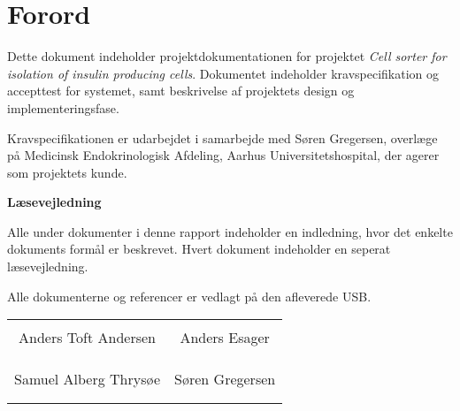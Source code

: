 \chapter*{Forord}

Dette dokument indeholder projektdokumentationen for projektet \textit{Cell sorter for isolation of insulin producing cells}. Dokumentet indeholder kravspecifikation og accepttest for systemet, samt beskrivelse af projektets design og implementeringsfase. 

Kravspecifikationen er udarbejdet i samarbejde med Søren Gregersen, overlæge på Medicinsk Endokrinologisk Afdeling, Aarhus Universitetshospital, der agerer som projektets kunde. 

\textbf{Læsevejledning}

Alle under dokumenter i denne rapport indeholder en indledning, hvor det enkelte dokuments formål er beskrevet. Hvert dokument indeholder en seperat læsevejledning.


Alle dokumenterne og referencer er vedlagt på den afleverede USB.

\phantom{Luft}

\phantom{Luft}

\begin{table}[H]
	\centering
		\begin{tabular}{c c}
			\underline{\phantom{mmmmmmmmmmmmmm}} & \underline{\phantom{mmmmmmmmmmmmmm}}  \\
			Anders Toft Andersen			& Anders Esager		 			\\
			&\\
			&\\
			\underline{\phantom{mmmmmmmmmmmmmm}} & \underline{\phantom{mmmmmmmmmmmmmm}}  \\
			Samuel Alberg Thrysøe			& Søren Gregersen 						\\
			&\\
			&\\
		 																									
		\end{tabular}
\end{table}